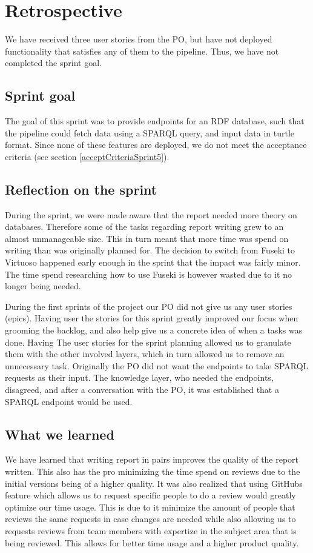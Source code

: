 \section{Retrospective}
We have received three user stories from the PO, but have not deployed functionality that satisfies any of them to the \knox{} pipeline. Thus, we have not completed the sprint goal.

\subsection{Sprint goal}
The goal of this sprint was to provide endpoints for an RDF database, such that the \knox{} pipeline could fetch data using a SPARQL query, and input data in turtle format.
Since none of these features are deployed, we do not meet the acceptance criteria (see section \ref{acceptCriteriaSprint5}).

\subsection{Reflection on the sprint}
During the sprint, we were made aware that the report needed more theory on databases. 
Therefore some of the tasks regarding report writing grew to an almost unmanageable size. This in turn meant that more time was spend on writing than was originally planned for.
The decision to switch from Fuseki to Virtuoso happened early enough in the sprint that the impact was fairly minor. The time spend researching how to use Fuseki is however wasted due to it no longer being needed.

During the first sprints of the project our PO did not give us any user stories (epics). Having user the stories for this sprint greatly improved our focus when grooming the backlog, and also help give us a concrete idea of when a tasks was done. 
Having The user stories for the sprint planning allowed us to granulate them with the other involved layers, which in turn allowed us to remove an unnecessary task. Originally the PO did not want the endpoints to take SPARQL requests as their input.
The knowledge layer, who needed the endpoints, disagreed, and after a conversation with the PO, it was established that a SPARQL endpoint would be used.

\subsection{What we learned}
We have learned that writing report in pairs improves the quality of the report written. This also has the pro minimizing the time spend on reviews due to the initial versions being of a higher quality.
It was also realized that using GitHubs feature which allows us to request specific people to do a review would greatly optimize our time usage. This is due to it minimize the amount of people that reviews the same requests in case changes are needed while also allowing us to requests reviews from team members with expertize in the subject area that is being reviewed. This allows for better time usage and a higher product quality. 

